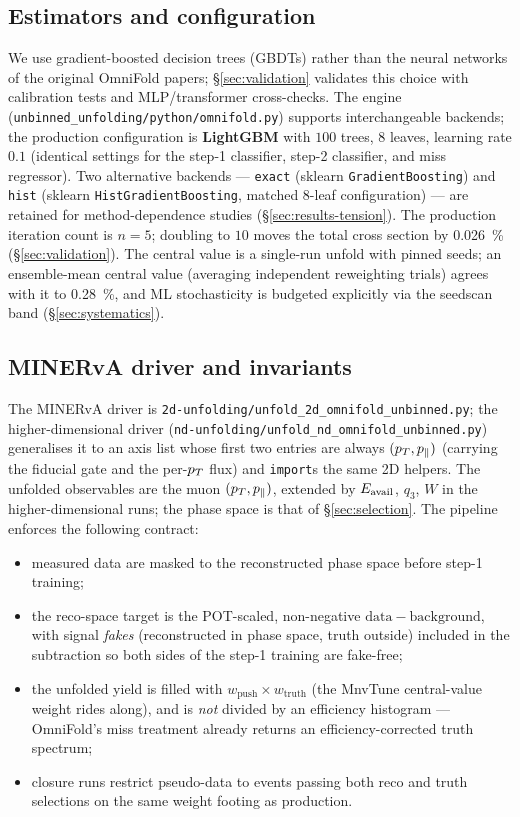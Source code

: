 \subsection{Estimators and configuration}
\label{sec:method-config}
We use gradient-boosted decision trees (GBDTs) rather than the neural networks
of the original OmniFold papers; \S\ref{sec:validation} validates this choice
with calibration tests and MLP/transformer cross-checks. The engine
(\texttt{unbinned\_unfolding/python/omnifold.py}) supports interchangeable
backends; the production configuration is \textbf{LightGBM} with
$100$ trees, $8$ leaves, learning rate $0.1$ (identical settings for the
step-1 classifier, step-2 classifier, and miss regressor). Two alternative
backends --- \texttt{exact} (sklearn \texttt{GradientBoosting}) and
\texttt{hist} (sklearn \texttt{HistGradientBoosting}, matched 8-leaf
configuration) --- are retained for method-dependence studies
(\S\ref{sec:results-tension}). The production iteration count is
$n=5$; doubling to $10$ moves the total cross section by
\SI{0.026}{\percent} (\S\ref{sec:validation}). The central value is a
single-run unfold with pinned seeds; an ensemble-mean central value (averaging
independent reweighting trials) agrees with it to \SI{0.28}{\percent}, and ML
stochasticity is budgeted explicitly via the seedscan band
(\S\ref{sec:systematics}).

\subsection{MINERvA driver and invariants}
\label{sec:method-driver}
The MINERvA driver is \texttt{2d-unfolding/unfold\_2d\_omnifold\_unbinned.py};
the higher-dimensional driver
(\texttt{nd-unfolding/unfold\_nd\_omnifold\_unbinned.py}) generalises it to an
axis list whose first two entries are always $(p_{T},p_{\parallel})$ (carrying the
fiducial gate and the per-$p_{T}$ flux) and \texttt{import}s the same 2D
helpers. The unfolded observables are the muon $(p_{T},p_{\parallel})$, extended by
$E_{\mathrm{avail}}$, $q_{3}$, $W$ in the higher-dimensional runs; the phase space is
that of \S\ref{sec:selection}. The pipeline enforces the following contract:
\begin{itemize}[itemsep=2pt]
  \item measured data are masked to the reconstructed phase space before
        step-1 training;
  \item the reco-space target is the POT-scaled, non-negative
        $\mathrm{data}-\mathrm{background}$, with signal \emph{fakes}
        (reconstructed in phase space, truth outside) included in the
        subtraction so both sides of the step-1 training are fake-free;
  \item the unfolded yield is filled with
        $w_{\mathrm{push}}\times w_{\mathrm{truth}}$ (the MnvTune
        central-value weight rides along), and is \emph{not} divided by an
        efficiency histogram --- OmniFold's miss treatment already returns an
        efficiency-corrected truth spectrum;
  \item closure runs restrict pseudo-data to events passing both reco and
        truth selections on the same weight footing as production.
\end{itemize}

